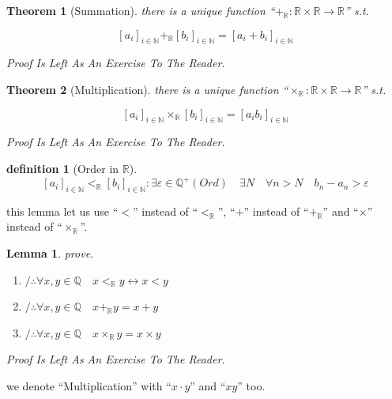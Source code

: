 \documentclass[10pt,a4paper]{book}
\newtheorem{definition}{definition}[section]
\newtheorem{theorem}{Theorem}[section]
\newtheorem{lemma}{Lemma}[section]
\begin{document}
\begin{theorem}[Summation] there is a unique function ``$+_\mathbb{R} :\mathbb{R} \times \mathbb{R} \to \mathbb{R}$'' s.t.

    \[  [a_i]_{i \in \mathbb{N}} +_\mathbb{R} [b_i]_{i \in \mathbb{N}}  = [a_i + b_i]_{i \in \mathbb{N}} \]

    Proof Is Left As An Exercise To The Reader.
\end{theorem}

\begin{theorem}[Multiplication] there is a unique function ``$\times_\mathbb{R} :\mathbb{R} \times \mathbb{R} \to \mathbb{R}$'' s.t.

    \[  [a_i]_{i \in \mathbb{N}} \times_\mathbb{R} [b_i]_{i \in \mathbb{N}}  = [a_i  b_i]_{i \in \mathbb{N}} \]

    Proof Is Left As An Exercise To The Reader.
\end{theorem}

\begin{definition}[Order in $\mathbb{R}$]
    \[  [a_i]_{i \in \mathbb{N}} <_\mathbb{R} [b_i]_{i \in \mathbb{N}}  :
        \exists \varepsilon \in \mathbb{Q}^+ (Ord) \quad \exists N  \quad \forall n > N  \quad  b_n - a_n  > \varepsilon  \]
\end{definition}

this lemma let us use ``$<$'' instead of ``$<_\mathbb{R}$'', ``$+$'' instead of
``$+_\mathbb{R}$'' and ``$\times$'' instead of ``$\times_\mathbb{R}$''.

\begin{lemma}prove.
    \begin{enumerate}
        \setlength{\itemsep}{0pt} %
        \item       $/ \therefore   \forall x,y \in \mathbb{Q} \quad x <_\mathbb{R} y  \leftrightarrow x  < y$
        \item       $/ \therefore   \forall x,y \in \mathbb{Q} \quad x +_\mathbb{R} y  = x  + y$
        \item       $/ \therefore   \forall x,y \in \mathbb{Q} \quad x \times_\mathbb{R} y  = x  \times y$
    \end{enumerate}
    Proof Is Left As An Exercise To The Reader.
\end{lemma}

we denote ``Multiplication'' with ``$x \cdot y$'' and ``$x y$'' too.
\end{document}
